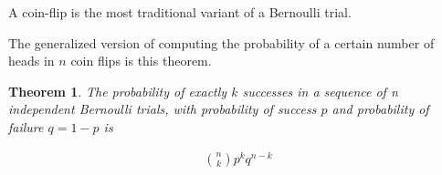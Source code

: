 \documentclass[12pt]{article}
\newtheorem{theorem}{Theorem}
\begin{document}
A coin-flip is the most traditional variant of a Bernoulli trial.

The generalized version of computing the probability of a certain number of heads in $n$ coin flips is this theorem.

\begin{theorem}
The probability of exactly $k$ successes in a sequence of n independent Bernoulli trials, with probability of success $p$ and probability of failure $q = 1-p$ is

\begin{align*}
\binom{n}{k}p^kq^{n-k}
\end{align*}

\end{theorem}
\end{document}
